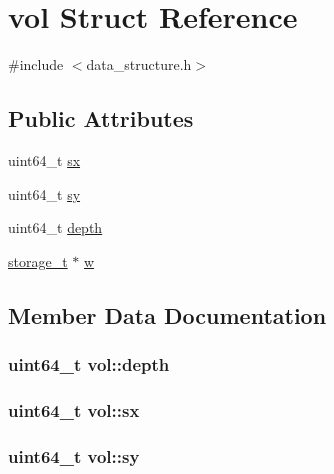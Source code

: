 \hypertarget{structvol}{}\section{vol Struct Reference}
\label{structvol}


{\ttfamily \#include $<$data\+\_\+structure.\+h$>$}

\subsection*{Public Attributes}
\begin{DoxyCompactItemize}
\item 
uint64\+\_\+t \hyperlink{structvol_a6ab39457172d961bd3d7b220b42eae48}{sx}
\item 
uint64\+\_\+t \hyperlink{structvol_aed16848bca7aef2d186eb821faed311b}{sy}
\item 
uint64\+\_\+t \hyperlink{structvol_a79d16e07196b0211caad966716f85050}{depth}
\item 
\hyperlink{setting_8h_a3529be440b2ef96493a3e8c22fcfcecc}{storage\+\_\+t} $\ast$ \hyperlink{structvol_a2e7e34090178b6d695341da3d1675c93}{w}
\end{DoxyCompactItemize}


\subsection{Member Data Documentation}
\subsubsection[{depth}]{\setlength{\rightskip}{0pt plus 5cm}uint64\+\_\+t vol\+::depth}\hypertarget{structvol_a79d16e07196b0211caad966716f85050}{}\label{structvol_a79d16e07196b0211caad966716f85050}
\subsubsection[{sx}]{\setlength{\rightskip}{0pt plus 5cm}uint64\+\_\+t vol\+::sx}\hypertarget{structvol_a6ab39457172d961bd3d7b220b42eae48}{}\label{structvol_a6ab39457172d961bd3d7b220b42eae48}
\subsubsection[{sy}]{\setlength{\rightskip}{0pt plus 5cm}uint64\+\_\+t vol\+::sy}\hypertarget{structvol_aed16848bca7aef2d186eb821faed311b}{}\label{structvol_aed16848bca7aef2d186eb821faed311b}
